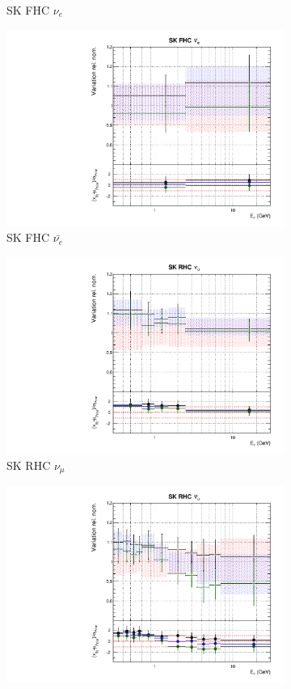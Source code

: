 \begin{figure}
\begin{subfigure}{0.24\textwidth}
  \caption{SK FHC $\nu_e$}
\end{subfigure}
\begin{subfigure}{0.24\textwidth}
  \centering
  \includegraphics[width=0.95\linewidth]{figs/fhcrhcfitsflux_11}
  \caption{SK FHC $\bar{\nu_{e}}$}
\end{subfigure}
\begin{subfigure}{0.24\textwidth}
  \centering
  \includegraphics[width=0.95\linewidth]{figs/fhcrhcfitsflux_12}
  \caption{SK RHC $\nu_{\mu}$}
\end{subfigure}
\begin{subfigure}{0.24\textwidth}
  \centering
  \includegraphics[width=0.95\linewidth]{figs/fhcrhcfitsflux_13}

\end{subfigure}
\end{figure}
